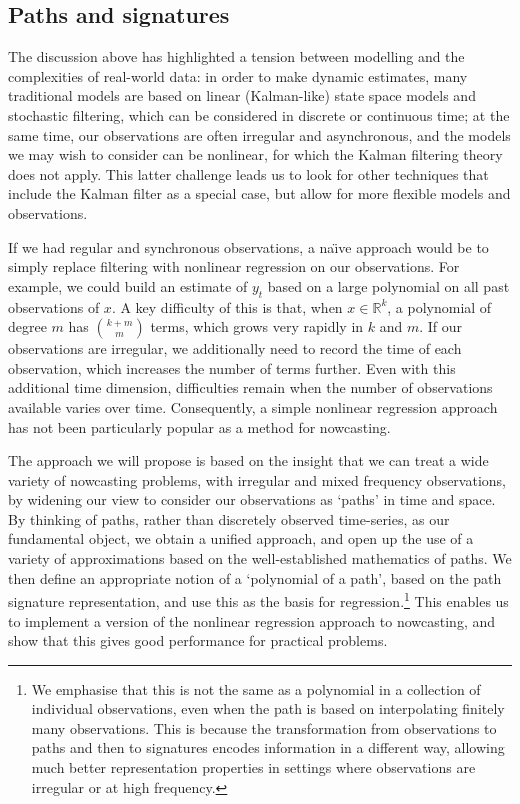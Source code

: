 \documentclass[a4paper, 12pt]{article}
\theoremstyle{remark}
\begin{document}
\subsection{Paths and signatures}\label{sec:sigs}

The discussion above has highlighted a tension between modelling and the complexities of real-world data: in order to make dynamic estimates, many traditional models are based on linear (Kalman-like) state space models and stochastic filtering, which can be considered in discrete or continuous time; at the same time, our observations are often irregular and asynchronous, and the models we may wish to consider can be nonlinear, for which the Kalman filtering theory does not apply. This latter challenge leads us to look for other techniques that include the Kalman filter as a special case, but allow for more flexible models and observations. 

If we had regular and synchronous observations, a na{\"\i}ve approach would be to simply replace filtering with nonlinear regression on our observations. For example, we could build an estimate of $y_t$ based on  a large polynomial on all past observations of $x$. A key difficulty of this is that, when $x\in\mathbb{R}^k$, a polynomial of degree $m$ has ${k+m}\choose{m}$ terms, which grows very rapidly in $k$ and $m$. If our observations are irregular, we additionally need to record the time of each observation, which increases the number of terms further. Even with this additional time dimension, difficulties remain when the number of observations available varies over time. Consequently, a simple nonlinear regression approach has not been particularly popular as a method for nowcasting.

The approach we will propose is based on the insight that we can treat a wide variety of nowcasting problems, with irregular and mixed frequency observations, by widening our view to consider our observations as `paths' in time and space. By thinking of paths, rather than discretely observed time-series, as our fundamental object, we obtain a unified approach, and open up the use of a variety of approximations based on the well-established mathematics of paths. We then define an appropriate notion of a `polynomial of a path', based on the path signature representation, and use this as the basis for regression.\footnote{We emphasise that this is not the same as a polynomial in a collection of individual observations, even when the path is based on interpolating finitely many observations. This is because the transformation from observations to paths and then to signatures encodes information in a different way, allowing much better representation properties in settings where observations are irregular or at high frequency.} This enables us to implement a version of the nonlinear regression approach to nowcasting, and show that this gives good performance for practical problems.
\end{document}
